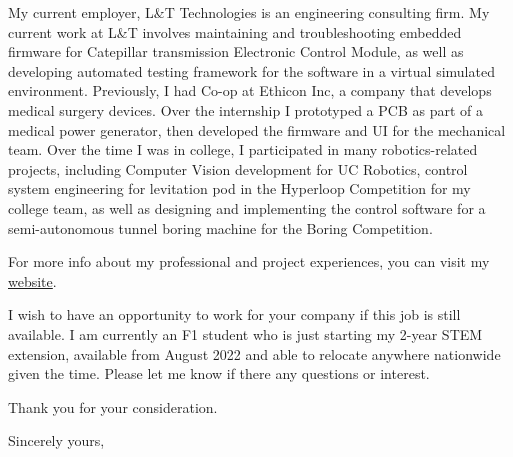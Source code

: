 \documentclass[11pt]{letter} %
\begin{document}
\begin{letter}
    \par My current employer, L\&T Technologies is an engineering consulting
    firm.
    My current work at L\&T involves maintaining and troubleshooting
    embedded firmware for Catepillar transmission Electronic Control Module,
    as well as developing automated testing framework for the software in a
    virtual simulated environment.
    Previously, I had Co-op at Ethicon Inc, a company that develops medical
    surgery devices.
    Over the internship I prototyped a PCB as part of a medical power generator,
    then developed the firmware and UI for the mechanical team.
    Over the time I was in college, I participated in many robotics-related
    projects, including Computer Vision development for UC Robotics, control
    system engineering for levitation pod in the Hyperloop Competition for my
    college team, as well as designing and implementing the control software for
    a semi-autonomous tunnel boring machine for the Boring Competition.

    For more info about my professional and project experiences, you can visit
    my \href{https://liu2z2.github.io/}{website}.

    \par I wish to have an opportunity to work for your company if this job is still available.
    I am currently an F1 student who is just starting my 2-year STEM extension,
    available from August 2022 and able to relocate anywhere nationwide given the time.
    Please let me know if there any questions or interest.

    \par Thank you for your consideration.

    \closing{Sincerely yours,}




\end{letter}
\end{document}
